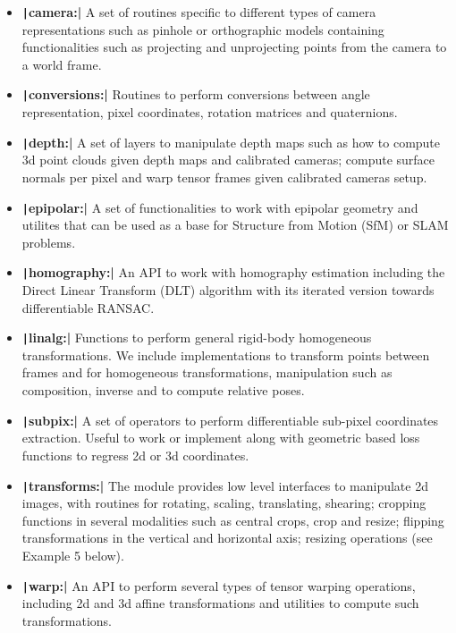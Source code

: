 \begin{itemize}
    \item \textbf{\texttt|camera:|} A set of routines specific to different types of camera representations such as pinhole or orthographic models containing functionalities such as projecting and unprojecting points from the camera to a world frame.
    \item \textbf{\texttt|conversions:|} Routines to perform conversions between angle representation, pixel coordinates, rotation matrices and quaternions.
    \item \textbf{\texttt|depth:|} A set of layers to manipulate depth maps such as how to compute 3d point clouds given depth maps and calibrated cameras; compute  surface normals per pixel and warp tensor frames given calibrated cameras setup.
    \item \textbf{\texttt|epipolar:|} A set of functionalities to work with epipolar geometry and utilites that can be used as a base for Structure from Motion (SfM) or SLAM problems.
    \item \textbf{\texttt|homography:|} An API to work with homography estimation including the Direct Linear Transform (DLT) algorithm with its iterated version towards differentiable RANSAC. 
    \item \textbf{\texttt|linalg:|} Functions to perform general rigid-body homogeneous transformations. We include implementations to transform points between frames and for homogeneous transformations, manipulation such as composition, inverse and to compute relative poses.
    \item \textbf{\texttt|subpix:|} A set of operators to perform differentiable sub-pixel coordinates extraction. Useful to work or implement along with geometric based loss functions to regress 2d or 3d coordinates.
    \item \textbf{\texttt|transforms:|} The module provides low level interfaces to manipulate 2d images,  with routines for rotating, scaling, translating, shearing; cropping functions in several modalities such as central crops, crop and resize; flipping transformations in the vertical and horizontal axis; resizing operations (see Example 5 below).
    \item \textbf{\texttt|warp:|} An API to perform several types of tensor warping operations, including 2d and 3d affine transformations and utilities to compute such transformations.
\end{itemize}

